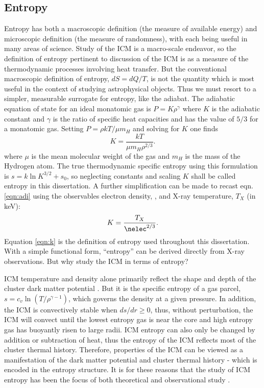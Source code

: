 \subsection{Entropy}
\label{sec:entintro}

Entropy has both a macroscopic definition (the measure of available
energy) and microscopic definition (the measure of randomness), with
each being useful in many areas of science. Study of the ICM is a
macro-scale endeavor, so the definition of entropy pertinent to
discussion of the ICM is as a measure of the thermodynamic processes
involving heat transfer. But the conventional macroscopic definition
of entropy, $dS=dQ/T$, is not the quantity which is most useful in the
context of studying astrophysical objects. Thus we must resort to a
simpler, measurable surrogate for entropy, like the adiabat. The
adiabatic equation of state for an ideal monatomic gas is
$P=K\rho^{\gamma}$ where $K$ is the adiabatic constant and $\gamma$ is
the ratio of specific heat capacities and has the value of $5/3$ for a
monatomic gas. Setting $P=\rho kT/\mu m_H$ and solving for $K$ one
finds
\begin{equation}
\label{eqn:adi}
K = \frac{kT}{\mu m_H \rho^{2/3}}.
\end{equation}
where $\mu$ is the mean molecular weight of the gas and $m_H$ is the
mass of the Hydrogen atom. The true thermodynamic specific entropy
using this formulation is $s = k \ln K^{3/2}+s_0$, so neglecting
constants and scaling $K$ shall be called entropy in this
dissertation. A further simplification can be made to recast
eqn. \ref{eqn:adi} using the observables electron density,
\nelec, and X-ray temperature, $T_X$ (in keV):
\begin{equation}
K = \frac{T_X}{\nelec^{2/3}}.
\label{eqn:k}
\end{equation}
Equation \ref{eqn:k} is the definition of entropy used throughout this
dissertation. With a simple functional form, ``entropy'' can be
derived directly from X-ray observations. But why study the ICM in
terms of entropy?

ICM temperature and density alone primarily reflect the shape and
depth of the cluster dark matter potential \citep{voitbryan}. But it
is the specific entropy of a gas parcel, $s = c_v \ln
(T/\rho^{\gamma-1})$, which governs the density at a given
pressure. In addition, the ICM is convectively stable when $ds/dr \ge
0$, thus, without perturbation, the ICM will convect until the lowest
entropy gas is near the core and high entropy gas has buoyantly risen
to large radii. ICM entropy can also only be changed by addition or
subtraction of heat, thus the entropy of the ICM reflects most of the
cluster thermal history. Therefore, properties of the ICM can be
viewed as a manifestation of the dark matter potential and cluster
thermal history - which is encoded in the entropy structure. It is for
these reasons that the study of ICM entropy has been the focus of both
theoretical and observational study \citep{1996ApJ...473..692D,
1997MNRAS.288..355B, 1999Natur.397..135P, davies00, tozzi01,
voitbryan, ponman03, piffaretti05, pratt06, radioquiet,
d06, morandi07, 2008MNRAS.386.1309M}.

